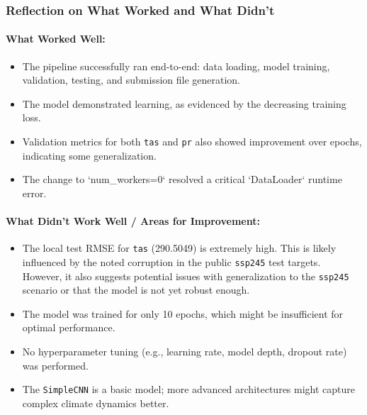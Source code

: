 \documentclass{article}
\begin{document}
\subsubsection{Reflection on What Worked and What Didn't}
\paragraph{What Worked Well:}
\begin{itemize}
    \item The pipeline successfully ran end-to-end: data loading, model training, validation, testing, and submission file generation.
    \item The model demonstrated learning, as evidenced by the decreasing training loss.
    \item Validation metrics for both \texttt{tas} and \texttt{pr} also showed improvement over epochs, indicating some generalization.
    \item The change to `num_workers=0` resolved a critical `DataLoader` runtime error.
\end{itemize}

\paragraph{What Didn't Work Well / Areas for Improvement:}
\begin{itemize}
    \item The local test RMSE for \texttt{tas} (290.5049) is extremely high. This is likely influenced by the noted corruption in the public \texttt{ssp245} test targets. However, it also suggests potential issues with generalization to the \texttt{ssp245} scenario or that the model is not yet robust enough.
    \item The model was trained for only 10 epochs, which might be insufficient for optimal performance.
    \item No hyperparameter tuning (e.g., learning rate, model depth, dropout rate) was performed.
    \item The \texttt{SimpleCNN} is a basic model; more advanced architectures might capture complex climate dynamics better.
\end{itemize}
\end{document}
